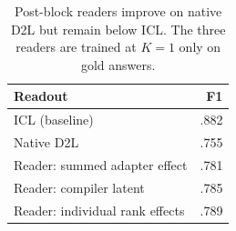 \begin{table}[t]
\centering
\caption{Post-block readers improve on native D2L but remain below ICL.
The three readers are trained at $K=1$ only on gold answers.}
\label{tab:readout-summary}
\small
\begin{tabular}{@{}lr@{}}
\toprule
Readout & F1 \\
\midrule
ICL (baseline) & .882 \\
Native D2L & .755 \\
Reader: summed adapter effect & .781 \\
Reader: compiler latent & .785 \\
Reader: individual rank effects & .789 \\
\bottomrule
\end{tabular}
\end{table}
